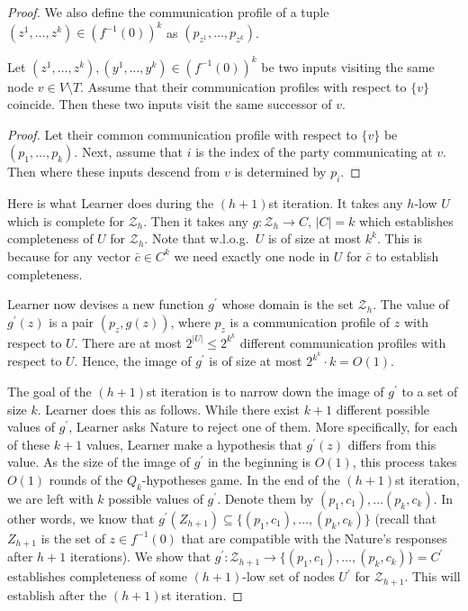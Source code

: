 \begin{proof}
We also define the communication profile of a tuple $(z^1, \ldots, z^k) \in (f^{-1}(0))^k$ as $(p_{z^1}, \ldots, p_{z^k})$.

\begin{lemma}
\label{communication_profile_lemma}
Let $(z^1, \ldots, z^k), (y^1, \ldots, y^k)  \in (f^{-1}(0))^k$ be two inputs visiting the same node $v\in V\setminus T$. Assume that their communication profiles with respect to $\{v\}$ coincide. Then these two inputs visit the same successor of $v$. 
\end{lemma}
\begin{proof}
Let their common communication profile with respect to $\{v\}$ be $(p_1, \ldots, p_k)$. Next, assume that $i$ is the index of the party communicating at $v$. Then where these inputs descend from $v$ is determined by $p_i$.
\end{proof}
Here is what Learner does during the $(h + 1)$st iteration. It 
%
 takes any $h$-low $U$ which is complete for $\mathcal{Z}_h$. 
 Then it %
 takes any $g\colon \mathcal{Z}_h\to C$, $|C| = k$ which establishes completeness of $U$ for $\mathcal{Z}_h$. 
 Note that w.l.o.g.~$U$ is of size at most $k^k$. This is because for any vector $\bar{c}\in C^k$ we need exactly one node in $U$ for $\bar{c}$ to establish completeness.

 Learner now devises a new function $g^\prime$ whose domain is the set $\mathcal{Z}_h$. The value of $g^\prime(z)$ is a pair $(p_z, g(z))$, where $p_z$ is a communication profile of $z$ with respect to $U$. There are at most $2^{|U|} \le 2^{k^k}$ different communication profiles with respect to $U$. Hence, the image of $g^\prime$ is of size at most $2^{k^k} \cdot k = O(1)$. 

The goal of the $(h+1)$st iteration is to narrow down the image of $g^\prime$ to a set of size $k$. Learner does this as follows. While there exist $k + 1$ different possible values of $g^\prime$, Learner asks Nature to reject one of them. More specifically, for each of these $k + 1$ values, Learner make a hypothesis that $g^\prime(z)$ differs from this value. As the size of the image of $g^\prime$ in the beginning is $O(1)$, this process takes $O(1)$ rounds of the $Q_k$-hypotheses game. In the end of the $(h+1)$st iteration, we are left with $k$ possible values of $g^\prime$. Denote them by $(p_1, c_1), \ldots (p_k, c_k)$. In other words, we know that $g^\prime(Z_{h+1})\subseteq \{(p_1, c_1), \ldots, (p_k, c_k)\}$ (recall that $Z_{h+1}$ is the set of $z\in f^{-1}(0)$ that are compatible with the Nature's responses after $h + 1$ iterations). We show that $g^\prime\colon \mathcal{Z}_{h  + 1}\to\{(p_1, c_1), \ldots, (p_k, c_k)\} = C^\prime$ establishes completeness of some $(h+1)$-low set of nodes $U^\prime$ for $\mathcal{Z}_{h+1}$. This will establish  after the $(h+1)$st iteration.


\end{proof}
